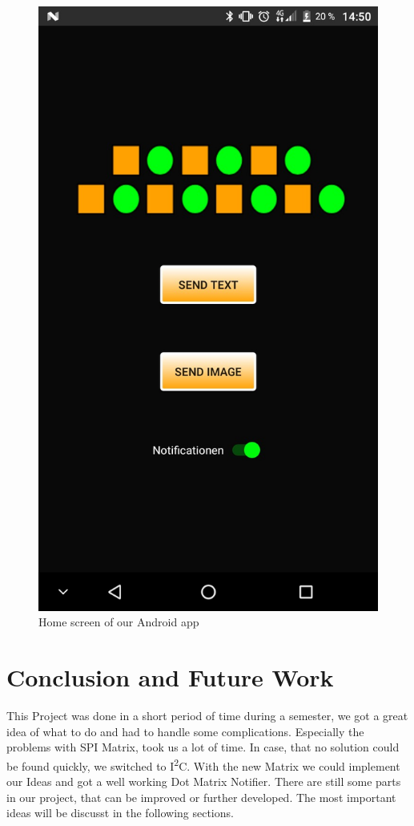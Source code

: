 \documentclass[conference]{IEEEtran}
\begin{document}
\begin{figure}[ht]
\centering
\includegraphics[width=0.75\linewidth]{pics/AppHomeScreen}
\caption{Home screen of our Android app}
\label{FIG:APP}
\end{figure}


\section{Conclusion and Future Work}
This Project was done in a short period of time during a semester, we got a great idea of what to do and had to handle some complications. Especially the problems with SPI Matrix, took us a lot of time. In case, that no solution could be found quickly, we switched to I\textsuperscript{2}C. With the new Matrix we could implement our Ideas and got a well working Dot Matrix Notifier.
There are still some parts in our project, that can be improved or further developed. The most important ideas will be discusst in the following sections.
\end{document}
